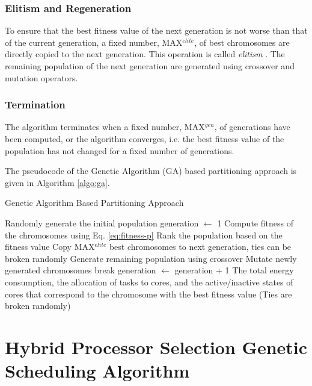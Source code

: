 \documentclass[conference]{IEEEtran}
\begin{document}
\subsubsection{Elitism and Regeneration} To ensure that the best fitness value of the next generation is not worse than that of the current generation,
a fixed number, MAX$^{elite}$, of best chromosomes are directly copied to the next generation. This operation is called \emph{elitism} \cite{Goldberg}.
The remaining population of the next generation are generated using crossover and mutation operators.


\subsubsection{Termination} The algorithm terminates when a fixed number, MAX$^{gen}$, of generations
have been computed, or the algorithm converges, i.e. the best fitness value of the population has not changed for a fixed number
of generations.

The pseudocode of the Genetic Algorithm (GA) based partitioning approach is given in Algorithm \ref{algo:ga}.

\begin{algorithm}
\caption{Genetic Algorithm Based Partitioning Approach} \label{algo:ga}
\footnotesize
\begin{algorithmic}[1]
\STATE Randomly generate the initial population
\STATE generation $\leftarrow$ 1
\STATE Compute fitness of the chromosomes using Eq. \ref{eq:fitness-p}
\STATE Rank the population based on the fitness value
\STATE Copy MAX$^{elite}$ best chromosomes to next generation, ties can be broken randomly
\STATE Generate remaining population using crossover
\STATE Mutate newly generated chromosomes
\STATE break
\ENDIF
\STATE generation  $\leftarrow$ generation  + 1
\ENDWHILE
\PRINT The total energy consumption, the allocation of tasks to cores, and the active/inactive states of cores that
correspond to the chromosome with the best fitness value (Ties are broken randomly)
\end{algorithmic}
\end{algorithm}

\vspace{-0.1in}



\section{Hybrid Processor Selection Genetic Scheduling Algorithm} %
\end{document}
